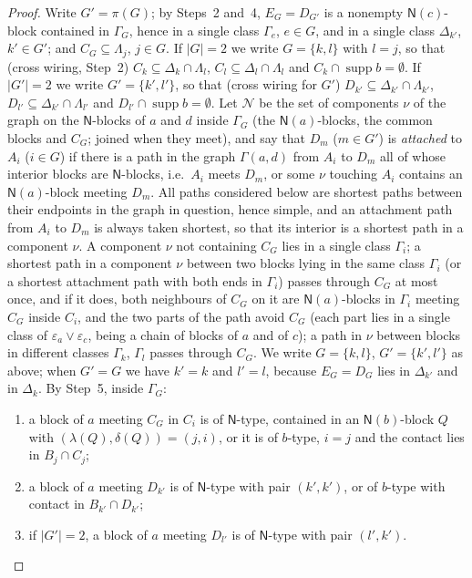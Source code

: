 \documentclass[11pt]{amsart}
\theoremstyle{definition}
\newcommand{\supp}{\operatorname{supp}}
\newcommand{\N}{\mathsf{N}}
\begin{document}
\begin{proof}
Write $G'=\pi(G)$; by Steps~2 and~4, $E_G=D_{G'}$ is a nonempty $\N(c)$-block contained in $\Gamma_G$, hence in a single class $\Gamma_e$, $e\in G$, and in a single class $\Delta_{k'}$, $k'\in G'$; and $C_G\subseteq\Lambda_j$, $j\in G$. If $|G|=2$ we write $G=\{k,l\}$ with $l=j$, so that (cross wiring, Step~2) $C_k\subseteq\Delta_k\cap\Lambda_l$, $C_l\subseteq\Delta_l\cap\Lambda_l$ and $C_k\cap\supp b=\emptyset$. If $|G'|=2$ we write $G'=\{k',l'\}$, so that (cross wiring for $G'$) $D_{k'}\subseteq\Delta_{k'}\cap\Lambda_{k'}$, $D_{l'}\subseteq\Delta_{k'}\cap\Lambda_{l'}$ and $D_{l'}\cap\supp b=\emptyset$. Let $\mathcal N$ be the set of components $\nu$ of the graph on the $\N$-blocks of $a$ and $d$ inside $\Gamma_G$ (the $\N(a)$-blocks, the common blocks and $C_G$; joined when they meet), and say that $D_m$ ($m\in G'$) is \emph{attached} to $A_i$ ($i\in G$) if there is a path in the graph $\Gamma(a,d)$ from $A_i$ to $D_m$ all of whose interior blocks are $\N$-blocks, i.e.\ $A_i$ meets $D_m$, or some $\nu$ touching $A_i$ contains an $\N(a)$-block meeting $D_m$. All paths considered below are shortest paths between their endpoints in the graph in question, hence simple, and an attachment path from $A_i$ to $D_m$ is always taken shortest, so that its interior is a shortest path in a component $\nu$. A component $\nu$ not containing $C_G$ lies in a single class $\Gamma_i$; a shortest path in a component $\nu$ between two blocks lying in the same class $\Gamma_i$ (or a shortest attachment path with both ends in $\Gamma_i$) passes through $C_G$ at most once, and if it does, both neighbours of $C_G$ on it are $\N(a)$-blocks in $\Gamma_i$ meeting $C_G$ inside $C_i$, and the two parts of the path avoid $C_G$ (each part lies in a single class of $\varepsilon_a\vee\varepsilon_c$, being a chain of blocks of $a$ and of $c$); a path in $\nu$ between blocks in different classes $\Gamma_k$, $\Gamma_l$ passes through $C_G$. We write $G=\{k,l\}$, $G'=\{k',l'\}$ as above; when $G'=G$ we have $k'=k$ and $l'=l$, because $E_G=D_G$ lies in $\Delta_{k'}$ and in $\Delta_k$. By Step~5, inside $\Gamma_G$:
\begin{enumerate}[nosep,label=(\roman*)]
\item a block of $a$ meeting $C_G$ in $C_i$ is of $\N$-type, contained in an $\N(b)$-block $Q$ with $(\lambda(Q),\delta(Q))=(j,i)$, or it is of $b$-type, $i=j$ and the contact lies in $B_j\cap C_j$;
\item a block of $a$ meeting $D_{k'}$ is of $\N$-type with pair $(k',k')$, or of $b$-type with contact in $B_{k'}\cap D_{k'}$;
\item if $|G'|=2$, a block of $a$ meeting $D_{l'}$ is of $\N$-type with pair $(l',k')$.
\end{enumerate}


\end{proof}
\end{document}
